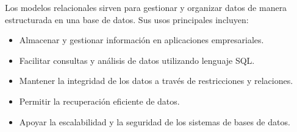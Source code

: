 \documentclass[a4paper,12pt]{article}
\begin{document}
\begin{enumerate}
    
    Los modelos relacionales sirven para gestionar y organizar datos de manera estructurada en una base de datos. Sus usos principales incluyen:
    \begin{itemize}
        \item Almacenar y gestionar información en aplicaciones empresariales.
        \item Facilitar consultas y análisis de datos utilizando lenguaje SQL.
        \item Mantener la integridad de los datos a través de restricciones y relaciones.
        \item Permitir la recuperación eficiente de datos.
        \item Apoyar la escalabilidad y la seguridad de los sistemas de bases de datos.
    \end{itemize}
    \thispagestyle{fancy} %
\end{enumerate}







\end{document}
